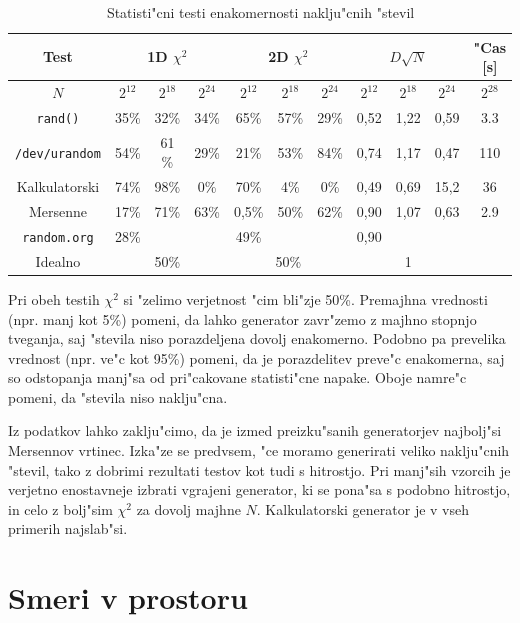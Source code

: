 \documentclass[a4paper,10pt]{article}
\begin{document}
\begin{table}[h]
 \centering
  \begin{tabular}{|c|c|c|c|c|c|c|c|c|c|c|}
  \hline
  Test & \multicolumn{3}{|c|}{1D $\chi^2$} & \multicolumn{3}{|c|}{2D $\chi^2$} & \multicolumn{3}{|c|}{$D\sqrt{N}$} & "Cas [s]\\
  \hline
  $N$ & $2^{12}$ & $2^{18}$ & $2^{24}$ & $2^{12}$ & $2^{18}$ & $2^{24}$ & $2^{12}$ & $2^{18}$ & $2^{24}$ & $2^{28}$ \\
  \hline
  \texttt{rand()} & 35\% & 32\% & 34\% & 65\% & 57\% & 29\% & 0,52 & 1,22 & 0,59 & 3.3 \\
  \texttt{/dev/urandom} & 54\% & 61 \% & 29\% & 21\% & 53\% & 84\% & 0,74 & 1,17 & 0,47 & 110 \\
  Kalkulatorski & 74\% & \cellcolor{red} 98\% & \cellcolor{red} 0\% & 70\% & \cellcolor{red} 4\% & \cellcolor{red} 0\% & 0,49 & 0,69 & \cellcolor{red} 15,2 & 36 \\
  Mersenne & 17\% & 71\% & 63\% & \cellcolor{red} 0,5\% & 50\% & 62\% & 0,90 & 1,07 & 0,63 & 2.9 \\
\hline
  \texttt{random.org} & 28\% & & & 49\% & & & 0,90 & & & \\
\hline
  Idealno & \multicolumn{3}{|c|}{50\%} & \multicolumn{3}{|c|}{50\%} & \multicolumn{3}{|c|}{1} & \\
\hline
   
  \end{tabular}
\caption{Statisti"cni testi enakomernosti naklju"cnih "stevil}
\end{table}

Pri obeh testih $\chi^2$ si "zelimo verjetnost "cim bli"zje 50\%. Premajhna vrednosti (npr. manj kot 5\%) pomeni, da lahko generator zavr"zemo z majhno stopnjo tveganja, saj "stevila niso porazdeljena dovolj enakomerno. Podobno pa prevelika vrednost (npr. ve"c kot 95\%) pomeni, da je porazdelitev preve"c enakomerna, saj so odstopanja manj"sa od pri"cakovane statisti"cne napake. Oboje namre"c pomeni, da "stevila niso naklju"cna. 

Iz podatkov lahko zaklju"cimo, da je izmed preizku"sanih generatorjev najbolj"si Mersennov vrtinec. Izka"ze se predvsem, "ce moramo generirati veliko naklju"cnih "stevil, tako z dobrimi rezultati testov kot tudi s hitrostjo. Pri manj"sih vzorcih je verjetno enostavneje izbrati vgrajeni generator, ki se pona"sa s podobno hitrostjo, in celo z bolj"sim $\chi^2$ za dovolj majhne $N$. Kalkulatorski generator je v vseh primerih najslab"si. 


\section{Smeri v prostoru}
\end{document}
